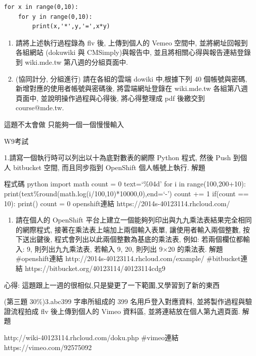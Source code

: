 \documentclass[]{article}
\begin{document}
\begin{verbatim}
for x in range(0,10):
    for y in range(0,10):
        print(x,'*',y,'=',x*y)
\end{verbatim}

\begin{enumerate}
\def\labelenumi{\arabic{enumi}.}
\setcounter{enumi}{1}
\item
  請將上述執行過程錄為 flv 後, 上傳到個人的 Vemeo 空間中,
  並將網址回報到各組網站 (dokuwiki 與 CMSimply)與報告中,
  並且將相關心得與報告連結登錄到 wiki.mde.tw 第八週的分組頁面中.
\item
  (協同計分, 分組進行) 請在各組的雲端 dowiki 中,根據下列 40
  個帳號與密碼, 新增對應的使用者帳號與密碼後, 將雲端網址登錄在
  wiki.mde.tw 各組第八週頁面中, 並說明操作過程與心得後, 將心得整理成 pdf
  後繳交到 course@mde.tw.
\end{enumerate}

這題不太會做 只能夠一個一個慢慢輸入

W9考試

1.請寫一個執行時可以列出以十為底對數表的網際 Python 程式, 然後 Push
到個人 bitbucket 空間, 而且同步指到 OpenShift 個人帳號上執行. 解題

程式碼 python import math count = 0 text=`\%04d' for i in
range(100,200+10):
print(text\%round(math.log(i/100,10)*10000,0),end=`-') count += 1
if(count == 10): print() count = 0 openshift連結
https://2014s-40123114.rhcloud.com/

\begin{enumerate}
\def\labelenumi{\arabic{enumi}.}
\setcounter{enumi}{1}
\itemsep1pt\parskip0pt
\item
  請在個人的 OpenShift
  平台上建立一個能夠列印出與九九乘法表結果完全相同的網際程式,
  接著在乘法表上端加上兩個輸入表單, 讓使用者輸入兩個整數, 按下送出鍵後,
  程式會列出以此兩個整數為基底的乘法表, 例如: 若兩個欄位都輸入: 9,
  則列出九九乘法表, 若輸入 9, 20, 則列出 9×20 的乘法表. 解題
  \#openshift連結 http://2014s-40123114.rhcloud.com/example/
  \#bitbucket連結 https://bitbucket.org/40123114/40123114cdg9
\end{enumerate}

心得: 這題跟上一週的很相似,只是變更了一下範圍,又學習到了新的東西

(第三題 30\%)3.abc399 字串所組成的 399 名用戶登入對應資料,
並將製作過程與驗證流程拍成 flv 後上傳到個人的 Vimeo 資料區,
並將連結放在個人第九週頁面. 解題

http://wiki-40123114.rhcloud.com/doku.php \#vimeo連結
https://vimeo.com/92575092
\end{document}

